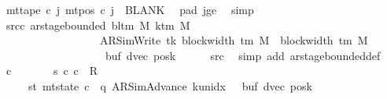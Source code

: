 \begin{isabellebody}
\ {\isachardoublequoteopen}mt{\isacharunderscore}{\kern0pt}tape\ c{}\ j\ {\isacharparenleft}{\kern0pt}mt{\isacharunderscore}{\kern0pt}pos\ c{}\ j{\isacharparenright}{\kern0pt}\ {\isacharequal}{\kern0pt}\ BLANK{}{\isachardoublequoteclose}\ \isamarkupfalse%
\ pad{}\ jge\ \isamarkupfalse%
\ simp\isanewline
\ \ \isamarkupfalse%
\isanewline
\ \ \isamarkupfalse%
\ src{\isacharunderscore}{\kern0pt}c{}{\isacharcolon}{\kern0pt}\ {\isachardoublequoteopen}ar{\isacharunderscore}{\kern0pt}stage{\isacharunderscore}{\kern0pt}bounded\ {\isacharparenleft}{\kern0pt}bl{\isacharunderscore}{\kern0pt}tm\ M{\isacharparenright}{\kern0pt}\ {\isacharparenleft}{\kern0pt}k{\isacharunderscore}{\kern0pt}tm\ M{\isacharparenright}{\kern0pt}\isanewline
\ \ \ \ \ \ \ \ \ \ \ \ \ \ \ \ \ \ {\isacharparenleft}{\kern0pt}AR{\isacharunderscore}{\kern0pt}SimWrite{\isacharcomma}{\kern0pt}\ tk{\isacharcomma}{\kern0pt}\ block{\isacharunderscore}{\kern0pt}width\ {\isacharparenleft}{\kern0pt}{\isasymGamma}{\isacharunderscore}{\kern0pt}tm\ M{\isacharparenright}{\kern0pt}\ {\isacharplus}{\kern0pt}\ {\isacharparenleft}{\kern0pt}block{\isacharunderscore}{\kern0pt}width\ {\isacharparenleft}{\kern0pt}{\isasymGamma}{\isacharunderscore}{\kern0pt}tm\ M{\isacharparenright}{\kern0pt}\ {\isacharminus}{\kern0pt}\ {}{\isacharparenright}{\kern0pt}{\isacharcomma}{\kern0pt}\isanewline
\ \ \ \ \ \ \ \ \ \ \ \ \ \ \ \ \ \ \ buf{\isacharcomma}{\kern0pt}\ dvec{\isacharcomma}{\kern0pt}\ posk{\isacharparenright}{\kern0pt}{\isachardoublequoteclose}\isanewline
\ \ \ \ \isamarkupfalse%
\ src{}\ \isamarkupfalse%
\ {\isacharparenleft}{\kern0pt}simp\ add{\isacharcolon}{\kern0pt}\ ar{\isacharunderscore}{\kern0pt}stage{\isacharunderscore}{\kern0pt}bounded{\isacharunderscore}{\kern0pt}def{\isacharparenright}{\kern0pt}\isanewline
\ \ \isamarkupfalse%
\ c{}\ \isanewline
\ \ \ \ \ \ s{}{\isacharcolon}{\kern0pt}\ {\isachardoublequoteopen}{\isacharparenleft}{\kern0pt}c{}{\isacharcomma}{\kern0pt}\ c{}{\isacharparenright}{\kern0pt}\ {\isasymin}\ {\isacharquery}{\kern0pt}R{\isachardoublequoteclose}\isanewline
\ \ \ \ \ st{}{\isacharcolon}{\kern0pt}\ {\isachardoublequoteopen}mt{\isacharunderscore}{\kern0pt}state\ c{}\ {\isacharequal}{\kern0pt}\ {\isacharparenleft}{\kern0pt}q{\isacharcomma}{\kern0pt}\ AR{\isacharunderscore}{\kern0pt}SimAdvance{\isacharcomma}{\kern0pt}\ k{\isacharunderscore}{\kern0pt}unidx\ {}{\isacharcomma}{\kern0pt}\ {}{\isacharcomma}{\kern0pt}\ buf{\isacharcomma}{\kern0pt}\ dvec{\isacharcomma}{\kern0pt}\ posk{\isacharparenright}{\kern0pt}{\isachardoublequoteclose}\isanewline

\end{isabellebody}
